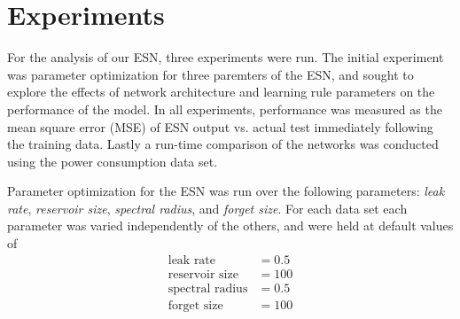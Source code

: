 \documentclass{acm_proc_article-sp}
\begin{document}
\section{Experiments}
For the analysis of our ESN, three experiments were run. The initial experiment was parameter optimization for three paremters of the ESN, and sought to explore the effects of network architecture and learning rule parameters on the performance of the model. In all experiments, performance was measured as the mean square error (MSE) of ESN output vs. actual test immediately following the training data. Lastly a run-time comparison of the networks was conducted using the power consumption data set.

Parameter optimization for the ESN was run over the following parameters: \emph{leak rate}, \emph{reservoir size}, \emph{spectral radius}, and \emph{forget size}. For each data set each parameter was varied independently of the others, and were held at default values of
\begin{align*}
\text{leak rate} &= 0.5 \\
\text{reservoir size} &= 100 \\
\text{spectral radius} &= 0.5 \\
\text{forget size} &= 100
\end{align*}
\end{document}
